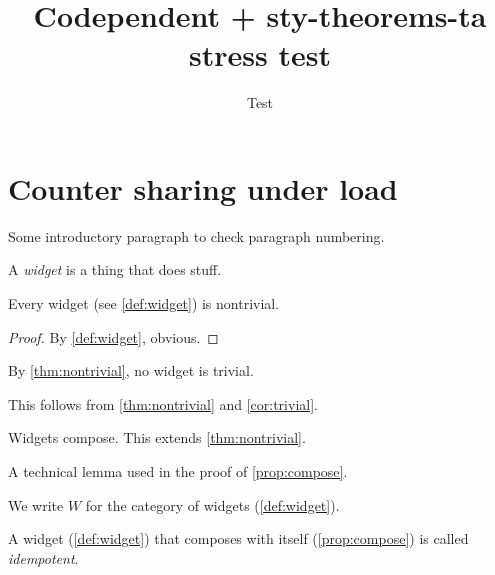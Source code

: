 \documentclass{article}
\title{Codependent + sty-theorems-ta stress test}
\author{Test}
\date{}
\begin{document}
\START
\maketitle

\section{Counter sharing under load}

Some introductory paragraph to check paragraph numbering.

\begin{definition}\label{def:widget}
A \emph{widget} is a thing that does stuff.
\end{definition}

\begin{theorem}\label{thm:nontrivial}
Every widget (see \cref{def:widget}) is nontrivial.
\end{theorem}

\begin{proof}
By \cref{def:widget}, obvious.
\end{proof}

\begin{corollary}\label{cor:trivial}
By \cref{thm:nontrivial}, no widget is trivial.
\end{corollary}

\begin{remark}\label{rem:note}
This follows from \cref{thm:nontrivial} and \cref{cor:trivial}.
\end{remark}

\begin{proposition}\label{prop:compose}
Widgets compose. This extends \cref{thm:nontrivial}.
\end{proposition}

\begin{lemma}\label{lem:technical}
A technical lemma used in the proof of \cref{prop:compose}.
\end{lemma}

\begin{notation}\label{not:W}
We write $W$ for the category of widgets (\cref{def:widget}).
\end{notation}

\begin{terminology}\label{term:idempotent}
A widget (\cref{def:widget}) that composes with itself
(\cref{prop:compose}) is called \emph{idempotent}.
\end{terminology}
\end{document}
